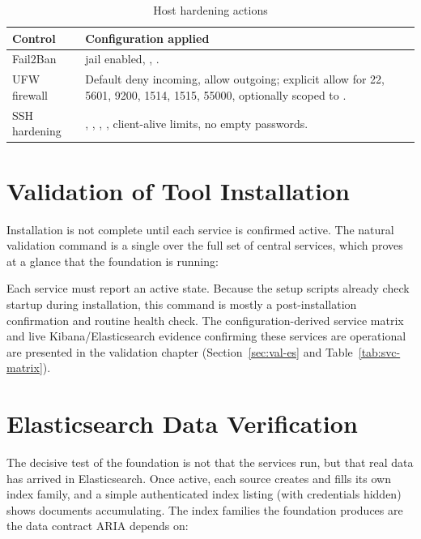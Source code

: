 \begin{table}[H]
\centering
\caption{Host hardening actions}
\begin{tabularx}{\textwidth}{@{}p{}Y@{}}
\toprule
\textbf{Control} & \textbf{Configuration applied} \\
\midrule
Fail2Ban &  jail enabled, , . \\
UFW firewall & Default deny incoming, allow outgoing; explicit allow for 22, 5601, 9200, 1514, 1515, 55000, optionally scoped to . \\
SSH hardening & , , , , client-alive limits, no empty passwords. \\
\bottomrule
\end{tabularx}
\end{table}

\section{Validation of Tool Installation}

Installation is not complete until each service is confirmed active. The natural validation command is a single  over the full set of central services, which proves at a glance that the foundation is running:

\begin{center}
\end{center}

Each service must report an active state. Because the setup scripts already check startup during installation, this command is mostly a post-installation confirmation and routine health check. The configuration-derived service matrix and live Kibana/Elasticsearch evidence confirming these services are operational are presented in the validation chapter (Section~\ref{sec:val-es} and Table~\ref{tab:svc-matrix}).

\section{Elasticsearch Data Verification}

The decisive test of the foundation is not that the services run, but that real data has arrived in Elasticsearch. Once active, each source creates and fills its own index family, and a simple authenticated index listing (with credentials hidden) shows documents accumulating. The index families the foundation produces are the data contract ARIA depends on:

